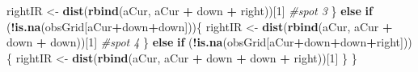 \documentclass[]{article}
\newenvironment{Shaded}{\begin{snugshade}}{\end{snugshade}}
\newcommand{\CommentTok}[1]{\textcolor[rgb]{0.56,0.35,0.01}{\textit{#1}}}
\newcommand{\ControlFlowTok}[1]{\textcolor[rgb]{0.13,0.29,0.53}{\textbf{#1}}}
\newcommand{\DecValTok}[1]{\textcolor[rgb]{0.00,0.00,0.81}{#1}}
\newcommand{\KeywordTok}[1]{\textcolor[rgb]{0.13,0.29,0.53}{\textbf{#1}}}
\newcommand{\NormalTok}[1]{#1}
\newcommand{\OperatorTok}[1]{\textcolor[rgb]{0.81,0.36,0.00}{\textbf{#1}}}
\newcommand{\StringTok}[1]{\textcolor[rgb]{0.31,0.60,0.02}{#1}}
\begin{document}
\begin{Shaded}
\begin{Highlighting}[]
\NormalTok{       rightIR <-}\StringTok{ }\KeywordTok{dist}\NormalTok{(}\KeywordTok{rbind}\NormalTok{(aCur, aCur }\OperatorTok{+}\StringTok{ }\NormalTok{down }\OperatorTok{+}\StringTok{ }\NormalTok{right))[}\DecValTok{1}\NormalTok{]}
       \CommentTok{#spot 3}
\NormalTok{    \} }\ControlFlowTok{else} \ControlFlowTok{if}\NormalTok{ (}\OperatorTok{!}\KeywordTok{is.na}\NormalTok{(obsGrid[aCur}\OperatorTok{+}\NormalTok{down}\OperatorTok{+}\NormalTok{down]))\{}
\NormalTok{    rightIR <-}\StringTok{ }\KeywordTok{dist}\NormalTok{(}\KeywordTok{rbind}\NormalTok{(aCur, aCur }\OperatorTok{+}\StringTok{ }\NormalTok{down }\OperatorTok{+}\StringTok{ }\NormalTok{down))[}\DecValTok{1}\NormalTok{]}
    \CommentTok{#spot 4}
\NormalTok{    \} }\ControlFlowTok{else} \ControlFlowTok{if}\NormalTok{ (}\OperatorTok{!}\KeywordTok{is.na}\NormalTok{(obsGrid[aCur}\OperatorTok{+}\NormalTok{down}\OperatorTok{+}\NormalTok{down}\OperatorTok{+}\NormalTok{right]))\{}
\NormalTok{      rightIR <-}\StringTok{ }\KeywordTok{dist}\NormalTok{(}\KeywordTok{rbind}\NormalTok{(aCur, aCur }\OperatorTok{+}\StringTok{ }\NormalTok{down }\OperatorTok{+}\StringTok{ }\NormalTok{down }\OperatorTok{+}\StringTok{ }\NormalTok{right))[}\DecValTok{1}\NormalTok{]}
\NormalTok{    \}}
\NormalTok{  \}}
  

\end{Highlighting}
\end{Shaded}
\end{document}
